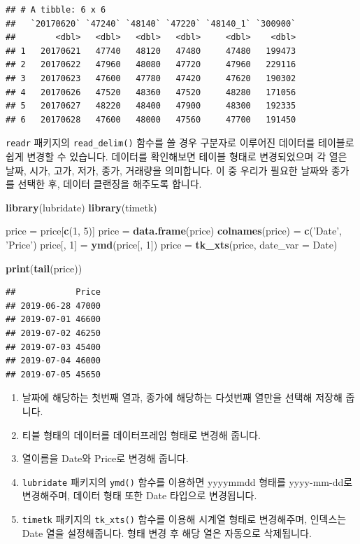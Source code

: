 \documentclass[12pt,]{book}
\newenvironment{Shaded}{\begin{snugshade}}{\end{snugshade}}
\newcommand{\DataTypeTok}[1]{\textcolor[rgb]{0.13,0.29,0.53}{#1}}
\newcommand{\DecValTok}[1]{\textcolor[rgb]{0.00,0.00,0.81}{#1}}
\newcommand{\KeywordTok}[1]{\textcolor[rgb]{0.13,0.29,0.53}{\textbf{#1}}}
\newcommand{\NormalTok}[1]{#1}
\newcommand{\StringTok}[1]{\textcolor[rgb]{0.31,0.60,0.02}{#1}}
\providecommand{\tightlist}{%
  \setlength{\itemsep}{0pt}\setlength{\parskip}{0pt}}
\begin{document}
\begin{verbatim}
## # A tibble: 6 x 6
##   `20170620` `47240` `48140` `47220` `48140_1` `300900`
##        <dbl>   <dbl>   <dbl>   <dbl>     <dbl>    <dbl>
## 1   20170621   47740   48120   47480     47480   199473
## 2   20170622   47960   48080   47720     47960   229116
## 3   20170623   47600   47780   47420     47620   190302
## 4   20170626   47520   48360   47520     48280   171056
## 5   20170627   48220   48400   47900     48300   192335
## 6   20170628   47600   48000   47560     47700   191450
\end{verbatim}

\texttt{readr} 패키지의 \texttt{read\_delim()} 함수를 쓸 경우 구분자로 이루어진 데이터를 테이블로 쉽게 변경할 수 있습니다. 데이터를 확인해보면 테이블 형태로 변경되었으며 각 열은 날짜, 시가, 고가, 저가, 종가, 거래량을 의미합니다. 이 중 우리가 필요한 날짜와 종가를 선택한 후, 데이터 클랜징을 해주도록 합니다.

\begin{Shaded}
\begin{Highlighting}[]
\KeywordTok{library}\NormalTok{(lubridate)}
\KeywordTok{library}\NormalTok{(timetk)}

\NormalTok{price =}\StringTok{ }\NormalTok{price[}\KeywordTok{c}\NormalTok{(}\DecValTok{1}\NormalTok{, }\DecValTok{5}\NormalTok{)] }
\NormalTok{price =}\StringTok{ }\KeywordTok{data.frame}\NormalTok{(price)}
\KeywordTok{colnames}\NormalTok{(price) =}\StringTok{ }\KeywordTok{c}\NormalTok{(}\StringTok{'Date'}\NormalTok{, }\StringTok{'Price'}\NormalTok{)}
\NormalTok{price[, }\DecValTok{1}\NormalTok{] =}\StringTok{ }\KeywordTok{ymd}\NormalTok{(price[, }\DecValTok{1}\NormalTok{])}
\NormalTok{price =}\StringTok{ }\KeywordTok{tk_xts}\NormalTok{(price, }\DataTypeTok{date_var =}\NormalTok{ Date)}
 
\KeywordTok{print}\NormalTok{(}\KeywordTok{tail}\NormalTok{(price))}
\end{Highlighting}
\end{Shaded}

\begin{verbatim}
##            Price
## 2019-06-28 47000
## 2019-07-01 46600
## 2019-07-02 46250
## 2019-07-03 45400
## 2019-07-04 46000
## 2019-07-05 45650
\end{verbatim}

\begin{enumerate}
\def\labelenumi{\arabic{enumi}.}
\tightlist
\item
  날짜에 해당하는 첫번째 열과, 종가에 해당하는 다섯번째 열만을 선택해 저장해 줍니다.
\item
  티블 형태의 데이터를 데이터프레임 형태로 변경해 줍니다.
\item
  열이름을 Date와 Price로 변경해 줍니다.
\item
  \texttt{lubridate} 패키지의 \texttt{ymd()} 함수를 이용하면 yyyymmdd 형태를 yyyy-mm-dd로 변경해주며, 데이터 형태 또한 Date 타입으로 변경됩니다.
\item
  \texttt{timetk} 패키지의 \texttt{tk\_xts()} 함수를 이용해 시계열 형태로 변경해주며, 인덱스는 Date 열을 설정해줍니다. 형태 변경 후 해당 열은 자동으로 삭제됩니다.
\end{enumerate}
\end{document}
